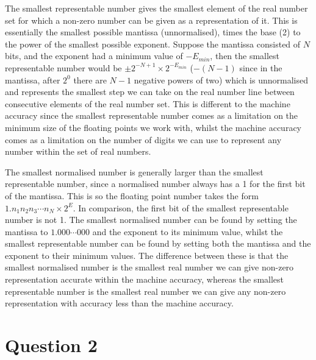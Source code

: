 \documentclass{article}
\begin{document}
The smallest representable number gives the smallest element of the real number set for which a non-zero number can be given as a representation of it. This is essentially the smallest possible mantissa (unnormalised), times the base (2) to the power of the smallest possible exponent. Suppose the mantissa consisted of $N$ bits, and the exponent had a minimum value of $-E_{min}$, then the smallest representable number would be $\pm 2^{-N+1}\times{2^{-E_{min}}}$ ($-(N-1)$ since in the mantissa, after $2^0$ there are $N-1$ negative powers of two) which is unnormalised and represents the smallest step we can take on the real number line between consecutive elements of the real number set. This is different to the machine accuracy since the smallest representable number comes as a limitation on the minimum size of the floating points we work with, whilst the machine accuracy comes as a limitation on the number of digits we can use to represent any number within the set of real numbers. 

The smallest normalised number is generally larger than the smallest representable number, since a normalised number always has a 1 for the first bit of the mantissa. This is so the floating point number takes the form $1.n_1n_2n_3\cdots{n_N}\times2^{E}$. In comparison, the first bit of the smallest representable number is not 1. The smallest normalised number can be found by setting the mantissa to $1.000\cdots{000}$ and the exponent to its minimum value, whilst the smallest representable number can be found by setting both the mantissa and the exponent to their minimum values. The difference between these is that the smallest normalised number is the smallest real number we can give non-zero representation accurate within the machine accuracy, whereas the smallest representable number is the smallest real number we can give any non-zero representation with  accuracy less than the machine accuracy.
 \newline

\section{Question 2}
\end{document}
